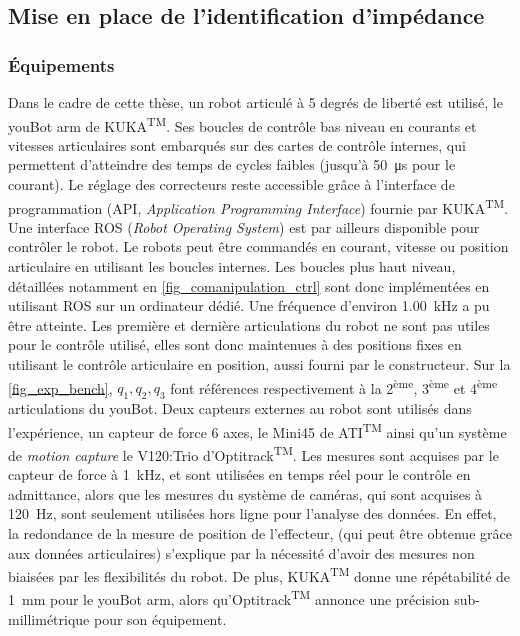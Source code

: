 \documentclass[12pt, a4paper]{article} %
\numberwithin{equation}{section}
\begin{document}
\subsection{Mise en place de l'identification d'impédance} \label{sec_impedance_estimation_sub_tools}

\subsubsection{Équipements} \label{sec_impedance_estimation_sub_tools_sub_apparatus}

Dans le cadre de cette thèse, un robot articulé à 5 degrés de liberté est utilisé, le youBot arm de KUKA\textsuperscript{TM}. Ses boucles de contrôle bas niveau en courants et vitesses articulaires sont embarqués sur des cartes de contrôle internes, qui permettent d'atteindre des temps de cycles faibles (jusqu'à \SI{50}{\micro\second} pour le courant). Le réglage des correcteurs reste accessible grâce à l'interface de programmation (API, \textit{Application Programming Interface}) fournie par KUKA\textsuperscript{TM}. Une interface ROS (\textit{Robot Operating System}) est par ailleurs disponible pour contrôler le robot. Le robots peut être commandés en courant, vitesse ou position articulaire en utilisant les boucles internes. Les boucles plus haut niveau, détaillées notamment en \cref{fig_comanipulation_ctrl} sont donc implémentées en utilisant ROS sur un ordinateur dédié. Une fréquence d'environ \SI{1.00}{\kilo\hertz} a pu être atteinte.
%
\newlineBlank
%
Les première et dernière articulations du robot ne sont pas utiles pour le contrôle utilisé, elles sont donc maintenues à des positions fixes en utilisant le contrôle articulaire en position, aussi fourni par le constructeur. Sur la \cref{fig_exp_bench}, $q_1, q_2, q_3$ font références respectivement à la 2\textsuperscript{ème}, 3\textsuperscript{ème} et 4\textsuperscript{ème} articulations du youBot.
%
\newlineBlank
%
Deux capteurs externes au robot sont utilisés dans l'expérience, un capteur de force 6 axes, le Mini45 de ATI\textsuperscript{TM} ainsi qu'un système de \textit{motion capture} le V120:Trio d'Optitrack\textsuperscript{TM}. Les mesures sont acquises par le capteur de force à \SI{1}{\kilo\hertz}, et sont utilisées en temps réel pour le contrôle en admittance, alors que les mesures du système de caméras, qui sont acquises à \SI{120}{\hertz}, sont seulement utilisées hors ligne pour l'analyse des données. En effet, la redondance de la mesure de position de l'effecteur, (qui peut être obtenue grâce aux données articulaires) s'explique par la nécessité d'avoir des mesures non biaisées par les flexibilités du robot. De plus, KUKA\textsuperscript{TM} donne une répétabilité de \SI{1}{\milli\metre} pour le youBot arm, alors qu'Optitrack\textsuperscript{TM} annonce une précision sub-millimétrique pour son équipement.
\end{document}
